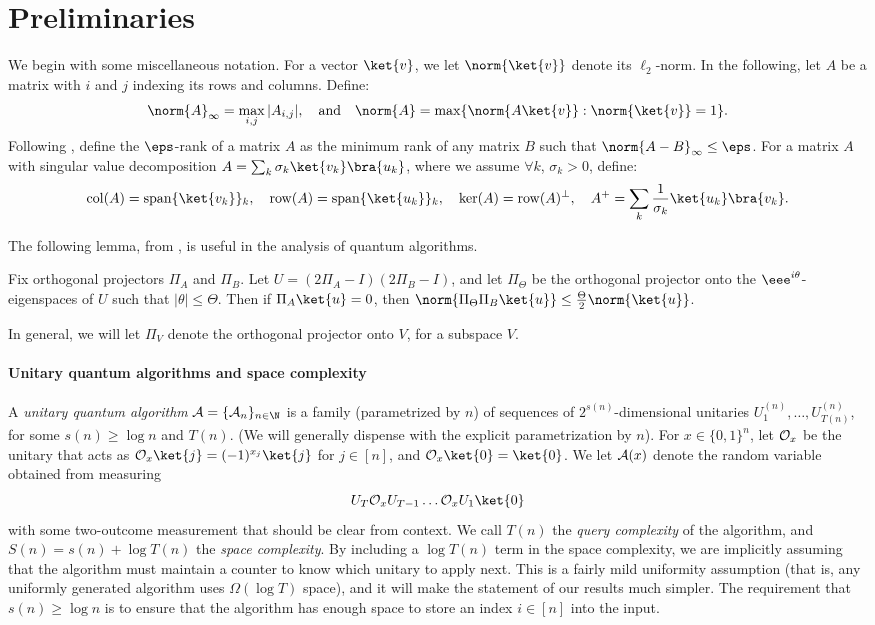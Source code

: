 \documentclass{toc}
\begin{document}
\section{Preliminaries}\label{sec:prelim}


We begin with some miscellaneous notation. For a vector $\ket{v}$, we let $\norm{\ket{v}}$ denote its $\ell_2$-norm.
In the following, let $A$ be a matrix with $i$ and $j$ indexing its rows and columns. Define:
$$\norm{A}_\infty=\max_{i,j}|A_{i,j}|,
\quad\mbox{and}\quad\norm{A}=\max\{\norm{A\ket{v}}:\norm{\ket{v}}=1\}.$$
Following \cite{ALSV13}, define the $\eps$-rank of a matrix $A$ as the minimum rank of any matrix $B$ such that $\norm{A-B}_{\infty}\leq \eps$. 
For a matrix $A$ with singular value decomposition $A=\sum_k\sigma_k\ket{v_k}\bra{u_k}$, where we assume $\forall k$, $\sigma_k>0$, define:
$$\mathrm{col}(A)=\mathrm{span}\{\ket{v_k}\}_k,
\quad \mathrm{row}(A)=\mathrm{span}\{\ket{u_k}\}_k,
\quad \ker(A)=\mathrm{row}(A)^\bot,
\quad A^+=\sum_k\frac{1}{\sigma_k}\ket{u_k}\bra{v_k}.$$

\noindent The following lemma, from \cite{LMR+11}, is useful in the analysis of quantum algorithms.
\begin{lemma}\label{lem:gap}
  Fix orthogonal projectors $\Pi_A$ and $\Pi_B$. Let $U=(2\Pi_A-I)(2\Pi_B-I)$, and let $\Pi_\Theta$ be the orthogonal projector onto the $\eee^{i\theta}$-eigenspaces of $U$ such that $|\theta|\leq \Theta$. Then if $\Pi_A\ket{u}=0$,
then %
%
$\norm{\Pi_\Theta\Pi_B\ket{u}}\leq \frac{\Theta}{2}\norm{\ket{u}}$. 
\end{lemma}
\noindent In general, we will let $\Pi_V$ denote the orthogonal projector onto $V$, for a subspace $V$. 



\paragraph{Unitary quantum algorithms and space complexity}

A \emph{unitary quantum algorithm} ${\cal A}=\{{\cal A}_n\}_{n\in\N}$ is a family (parametrized by $n$) of sequences of $2^{s(n)}$-dimensional unitaries $U_1^{(n)},\dots,U_{T(n)}^{(n)}$, for some $s(n)\geq \log n$ and $T(n)$. (We will generally dispense with the explicit parametrization by $n$). For $x\in\{0,1\}^n$, let ${\cal O}_x$ be the unitary that acts as ${\cal O}_x\ket{j}=(-1)^{x_j}\ket{j}$ for $j\in [n]$, and ${\cal O}_x\ket{0}=\ket{0}$. 
We let ${\cal A}(x)$ denote the random variable obtained from measuring 
$$U_T{\cal O}_x U_{T-1}\dots {\cal O}_xU_1\ket{0}$$
with some two-outcome measurement that should be clear from context. We call $T(n)$ the \emph{query complexity} of the algorithm, and $S(n)=s(n)+\log T(n)$ the \emph{space complexity}. By including a $\log T(n)$ term in the space complexity, we are implicitly assuming that the algorithm must maintain a counter to know which unitary to apply next. This is a fairly mild uniformity assumption (that is, any uniformly generated algorithm uses $\Omega(\log T)$ space), and it will make the statement of our results much simpler. 
The requirement that $s(n)\geq \log n$ is to ensure that the algorithm has enough space to store an index $i\in [n]$ into the input. 
\end{document}
